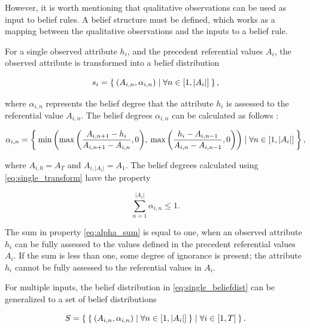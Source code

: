 However, it is worth mentioning that qualitative observations can be used as input to belief rules. A belief structure must be
defined, which works as a mapping between the qualitative observations and the inputs to a belief rule.

For a single observed attribute
$h_i$, and the precedent referential values $A_i$, the observed attribute is transformed into a belief distribution

\begin{equation}
\label{eq:single_beliefdist}
s_i = \Set{\left(A_{i, n}, \alpha_{i, n}\right) \mid \forall n \in \left[1, \left|A_i\right|\right]},
\end{equation}

where $\alpha_{i,n}$ represents the belief degree that the attribute $h_i$ is assessed to the referential value
$A_{i,n}$. The belief degrees $\alpha_{i, n}$ can be calculated as follows \cite{Chen2011}:

\begin{equation}
    \label{eq:single_transform}
    \alpha_{i, n} = \Set{
    \min{\left(
    \max{\left( \frac{A_{i, n+1} - h_i}{A_{i, n+1} - A_{i, n}}, 0 \right)},\:
    \max{\left( \frac{h_i - A_{i, n-1}}{A_{i, n} - A_{i, n-1}}, 0 \right)}
    \right)}
    \mid \forall n \in \left[1, \left|A_i\right|\right] },
\end{equation}

where $A_{i, 0} = A_T$ and $A_{i, \left|A_i\right|} = A_1$. The belief degrees calculated using
\eqref{eq:single_transform} have the property

\begin{equation}
    \label{eq:alpha_sum}
    \sum_{n=1}^{\left|A_i\right|} \alpha_{i, n} \leq 1.
\end{equation}

The sum in property \eqref{eq:alpha_sum} is equal to one, when an observed attribute $h_i$ can be fully assessed to
the values defined in the precedent referential values $A_i$. If the sum is less than one,
some degree of ignorance is present; the attribute $h_i$ cannot be fully assessed to the referential
values in $A_i$.

For multiple inputs, the belief distribution in \eqref{eq:single_beliefdist} can be generalized to a set
of belief distributions

\begin{equation}
\label{eq:multi_beliefdist}
    S = \Set{
    \Set{
    \left(A_{i, n}, \alpha_{i, n}\right) \mid \forall n \in \left[1, \left|A_i\right|\right]
    } \mid \forall i \in \left[ 1, T \right]
    }.
\end{equation}

